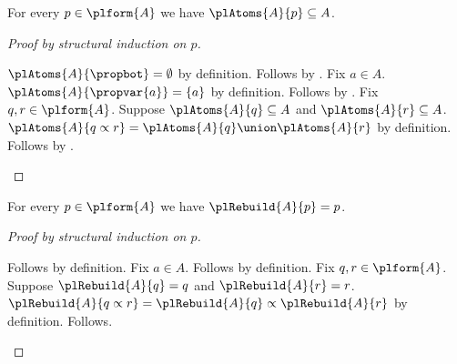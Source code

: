 \begin{proposition}\label{pl_atoms_subset}
    For every $p\in\plform{A}$ we have $\plAtoms{A}{p}\subseteq A$.
\end{proposition}
\begin{proof}[Proof by structural induction on $p$]
    \begin{byCase}
            $\plAtoms{A}{\propbot}=\emptyset$ by definition.
            Follows by .
            Fix $a\in A$.
            $\plAtoms{A}{\propvar{a}}=\{a\}$ by definition.
            Follows by .
            Fix $q,r\in\plform{A}$.
            Suppose $\plAtoms{A}{q}\subseteq A$ and $\plAtoms{A}{r}\subseteq A$.
            $\plAtoms{A}{q\propto r}=\plAtoms{A}{q}\union\plAtoms{A}{r}$ by definition.
            Follows by .
    \end{byCase}
\end{proof}

\begin{proposition}\label{pl_rebuild_identity}
    For every $p\in\plform{A}$ we have $\plRebuild{A}{p}=p$.
\end{proposition}
\begin{proof}[Proof by structural induction on $p$]
    \begin{byCase}
            Follows by definition.
            Fix $a\in A$.
            Follows by definition.
            Fix $q,r\in\plform{A}$.
            Suppose $\plRebuild{A}{q}=q$ and $\plRebuild{A}{r}=r$.
            $\plRebuild{A}{q\propto r}=\plRebuild{A}{q}\propto\plRebuild{A}{r}$ by definition.
            Follows.
    \end{byCase}
\end{proof}
